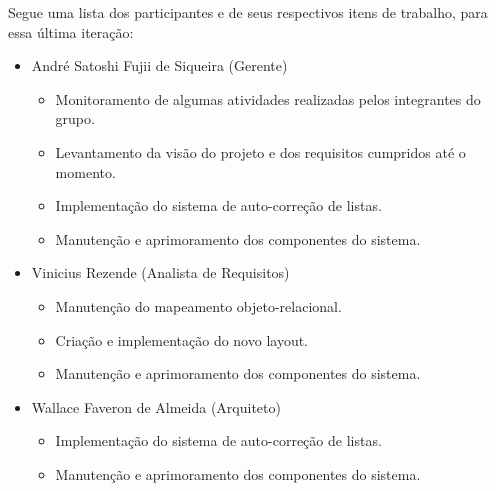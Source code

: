 \documentclass[12pt,letterpaper]{article}
\begin{document}
Segue uma lista dos participantes e de seus respectivos itens de trabalho, para essa última iteração: 

\begin{itemize}


\item {}André Satoshi Fujii de Siqueira (Gerente)\\
\vspace{-0.5cm}
\begin{itemize}
\item{}Monitoramento de algumas atividades realizadas pelos integrantes do grupo.\\
\item{}Levantamento da visão do projeto e dos requisitos cumpridos até o momento.\\
\item{}Implementação do sistema de auto-correção de listas.\\
\item{}Manutenção e aprimoramento dos componentes do sistema.
\end{itemize}
\vspace{0.5cm}

\item {}Vinicius Rezende (Analista de Requisitos)\\
\vspace{-0.5cm}
\begin{itemize}
\item{}Manutenção do mapeamento objeto-relacional.\\
\item{}Criação e implementação do novo layout.\\
\item{}Manutenção e aprimoramento dos componentes do sistema.
\end{itemize}
\vspace{0.5cm}

\item {}Wallace Faveron de Almeida (Arquiteto)\\
\vspace{-0.5cm}
\begin{itemize}
\item{}Implementação do sistema de auto-correção de listas.\\
\item{}Manutenção e aprimoramento dos componentes do sistema.
\end{itemize}
\vspace{0.5cm}


\end{itemize}
\end{document}

